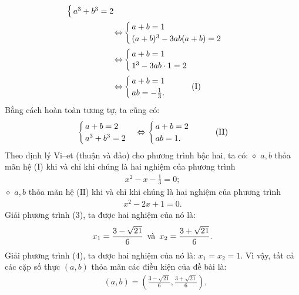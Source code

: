 \begin{multicols}{2}
\begin{align*}
\begin{cases}
			a^3 + b^3 = 2
		\end{cases} \\
	\Leftrightarrow &\begin{cases}
		a + b = 1\\
		(a+b)^3 - 3ab(a + b) = 2
	\end{cases}\\
	\Leftrightarrow &\begin{cases}
		a + b = 1\\
		1^3 - 3ab\cdot 1 = 2
	\end{cases}\\
	\Leftrightarrow& \begin{cases}
		a + b = 1 \\
		ab= -\frac{1}{3}.
	\end{cases} \tag{$\text{I}$}
	\end{align*}
	Bằng cách hoàn toàn tương tự, ta cũng có:
	\begin{align*}
		\begin{cases}
			a + b = 2\\
			a^3 + b^3 = 2
		\end{cases} \Leftrightarrow \begin{cases}
		a + b = 2\\
		ab = 1.
	\end{cases} \tag{$\text{II}$}
	\end{align*}
	Theo định lý Vi--et (thuận và đảo) cho phương trình bậc hai, ta có:
	\vskip 0.05cm
	$\diamond$ $a, b$ thỏa mãn hệ ($\text{I}$) khi và chỉ khi chúng là hai nghiệm của phương trình
	\begin{align*}
		x^2 -x - \frac{1}{3} = 0; \tag{$3$}
	\end{align*}
	$\diamond$ $a, b$ thỏa mãn hệ ($\text{II}$) khi và chỉ khi chúng là hai nghiệm của phương trình
	\begin{align*}
		x^2 - 2x + 1 = 0. \tag{$4$}
	\end{align*}
	Giải phương trình ($3$), ta được hai nghiệm của nó là:
	\begin{align*}
		{x_1} = \frac{{3 - \sqrt {21} }}{6} \text{\, và \,} {x_2} = \frac{{3 + \sqrt {21} }}{6}.
	\end{align*}  
	Giải phương trình ($4$), ta được hai nghiệm của nó là: $x_1 = x_2 = 1$. 
	\vskip 0.05cm
	Vì vậy, tất cả các cặp số thực $(a, b)$ thỏa mãn các điều kiện của đề bài là:
	\begin{align*}
		&\left( {a,b} \right) = \left( {\frac{{3 - \sqrt {21} }}{6},\frac{{3 + \sqrt {21} }}{6}} \right),\\

\end{align*}
\end{multicols}
